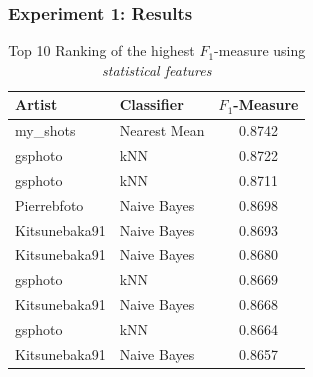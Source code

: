 \subsubsection{Experiment 1: Results}


\begin{table}
    \centering
    \begin{tabular}
        { | l | l | c |} 
        \hline
        Artist & Classifier & $F_1$-Measure \\
        \hline
        my\_shots & Nearest Mean & 0.8742 \\ 
        gsphoto & kNN & 0.8722 \\ 
        gsphoto & kNN & 0.8711 \\ 
        Pierrebfoto & Naive Bayes & 0.8698 \\ 
        Kitsunebaka91 & Naive Bayes & 0.8693 \\
        Kitsunebaka91 & Naive Bayes & 0.8680 \\
        gsphoto & kNN & 0.8669 \\
        Kitsunebaka91 & Naive Bayes & 0.8668 \\
        gsphoto & kNN & 0.8664 \\
        Kitsunebaka91 & Naive Bayes & 0.8657 \\
        \hline 
    \end{tabular}
    \caption{Top 10 Ranking of the highest $F_1$-measure using \textit{statistical features}}
    \label{ex1aresults}
\end{table}

